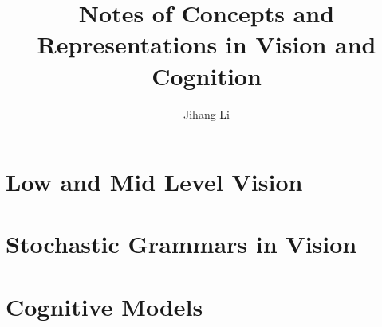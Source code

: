 \documentclass[10pt,oneside]{book}
\title{Notes of Concepts and Representations in Vision and Cognition}
\author{Jihang Li}
\begin{document}
\maketitle
\tableofcontents

\part{Low and Mid Level Vision}%


\part{Stochastic Grammars in Vision}




\part{Cognitive Models}




\end{document}
